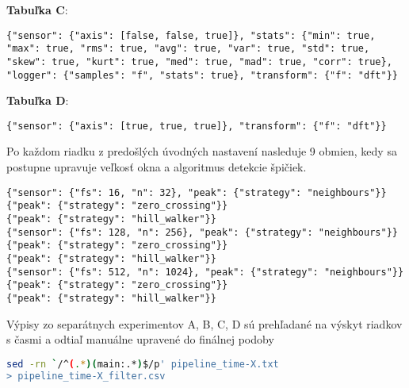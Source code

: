 \textbf{Tabuľka C}:
\begin{lstlisting}[style=experiments]
{"sensor": {"axis": [false, false, true]}, "stats": {"min": true, "max": true, "rms": true, "avg": true, "var": true, "std": true, "skew": true, "kurt": true, "med": true, "mad": true, "corr": true},  "logger": {"samples": "f", "stats": true}, "transform": {"f": "dft"}}
\end{lstlisting}

\textbf{Tabuľka D}:
\begin{lstlisting}[style=experiments]
{"sensor": {"axis": [true, true, true]}, "transform": {"f": "dft"}}
\end{lstlisting}

\noindent Po každom riadku z predošlých úvodných nastavení nasleduje 9 obmien, kedy
sa postupne upravuje veľkosť okna a algoritmus detekcie špičiek.
\begin{lstlisting}[style=experiments]
{"sensor": {"fs": 16, "n": 32}, "peak": {"strategy": "neighbours"}}
{"peak": {"strategy": "zero_crossing"}}
{"peak": {"strategy": "hill_walker"}}
{"sensor": {"fs": 128, "n": 256}, "peak": {"strategy": "neighbours"}}
{"peak": {"strategy": "zero_crossing"}}
{"peak": {"strategy": "hill_walker"}}
{"sensor": {"fs": 512, "n": 1024}, "peak": {"strategy": "neighbours"}}
{"peak": {"strategy": "zero_crossing"}}
{"peak": {"strategy": "hill_walker"}}
\end{lstlisting}

\noindent Výpisy zo separátnych experimentov A, B, C, D sú prehľadané na výskyt riadkov s časmi a odtiaľ 
manuálne upravené do finálnej podoby
\begin{lstlisting}[style=messages, language=sh]
sed -rn `/^(.*)(main:.*)$/p' pipeline_time-X.txt 
> pipeline_time-X_filter.csv
\end{lstlisting}
